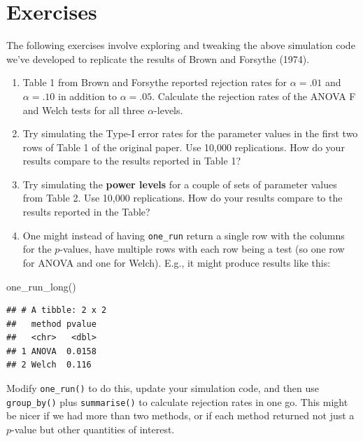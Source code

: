 \documentclass[
]{book}
\newenvironment{Shaded}{\begin{snugshade}}{\end{snugshade}}
\newcommand{\FunctionTok}[1]{\textcolor[rgb]{0.00,0.00,0.00}{#1}}
\newcommand{\NormalTok}[1]{#1}
\begin{document}
\hypertarget{exAnovaExercises}{%
\section{Exercises}\label{exAnovaExercises}}

The following exercises involve exploring and tweaking the above simulation code we've developed to replicate the results of Brown and Forsythe (1974).

\begin{enumerate}
\def\labelenumi{\arabic{enumi}.}
\item
  Table 1 from Brown and Forsythe reported rejection rates for \(\alpha = .01\) and \(\alpha = .10\) in addition to \(\alpha = .05\). Calculate the rejection rates of the ANOVA F and Welch tests for all three \(\alpha\)-levels.
\item
  Try simulating the Type-I error rates for the parameter values in the first two rows of Table 1 of the original paper. Use 10,000 replications. How do your results compare to the results reported in Table 1?
\item
  Try simulating the \textbf{power levels} for a couple of sets of parameter values from Table 2. Use 10,000 replications. How do your results compare to the results reported in the Table?
\item
  One might instead of having \texttt{one\_run} return a single row with the columns for the \(p\)-values, have multiple rows with each row being a test (so one row for ANOVA and one for Welch). E.g., it might produce results like this:
\end{enumerate}

\begin{Shaded}
\begin{Highlighting}[]
\FunctionTok{one\_run\_long}\NormalTok{()}
\end{Highlighting}
\end{Shaded}

\begin{verbatim}
## # A tibble: 2 x 2
##   method pvalue
##   <chr>   <dbl>
## 1 ANOVA  0.0158
## 2 Welch  0.116
\end{verbatim}

Modify \texttt{one\_run()} to do this, update your simulation code, and then use \texttt{group\_by()} plus \texttt{summarise()} to calculate rejection rates in one go. This might be nicer if we had more than two methods, or if each method returned not just a \(p\)-value but other quantities of interest.
\end{document}
